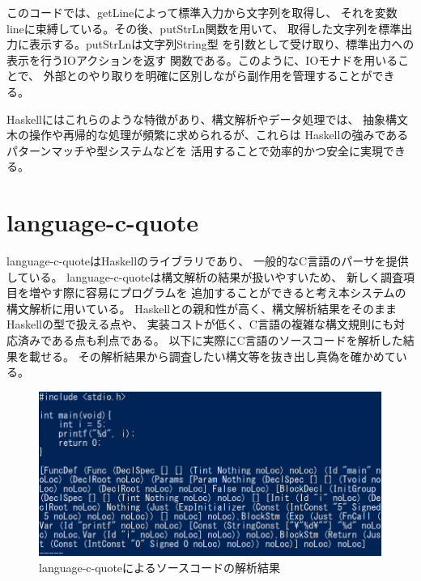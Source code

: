 \documentclass{cssspaper}
\begin{document}
\begin{itemize}
                このコードでは、getLineによって標準入力から文字列を取得し、
                それを変数lineに束縛している。その後、putStrLn関数を用いて、
                取得した文字列を標準出力に表示する。putStrLnは文字列String型
                を引数として受け取り、標準出力への表示を行うIOアクションを返す
                関数である。このように、IOモナドを用いることで、
                外部とのやり取りを明確に区別しながら副作用を管理することができる。

            \end{itemize}
            Haskellにはこれらのような特徴があり、構文解析やデータ処理では、
            抽象構文木の操作や再帰的な処理が頻繁に求められるが、これらは
            Haskellの強みであるパターンマッチや型システムなどを
            活用することで効率的かつ安全に実現できる。

        \section{language-c-quote}
        language-c-quoteはHaskellのライブラリであり、
        一般的なC言語のパーサを提供している。
        language-c-quoteは構文解析の結果が扱いやすいため、
        新しく調査項目を増やす際に容易にプログラムを
        追加することができると考え本システムの構文解析に用いている。
        Haskellとの親和性が高く、構文解析結果をそのままHaskellの型で扱える点や、
        実装コストが低く、C言語の複雑な構文規則にも対応済みである点も利点である。
        以下に実際にC言語のソースコードを解析した結果を載せる。
        その解析結果から調査したい構文等を抜き出し真偽を確かめている。
        \begin{figure}[h]
            \centering
            \includegraphics[width=15cm]{lcq.png}
            \caption{language-c-quoteによるソースコードの解析結果}
            \label{fig:lcq}
        \end{figure}
\end{document}
